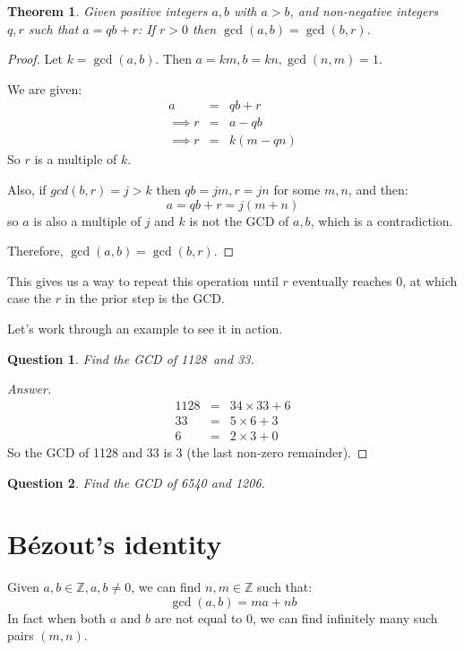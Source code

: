 \documentclass{article}
\newtheorem{theorem}{Theorem}
\newtheorem{question}{Question}
\begin{document}
\begin{theorem}
Given positive integers $a,b$ with $a>b$, and non-negative integers $q,r$ such that $a=qb+r$:
If $r>0$ then $\gcd(a,b) = \gcd(b,r)$.
\end{theorem}

\begin{proof}
Let $k = \gcd(a,b)$. Then $a=km, b=kn, \gcd(n,m) = 1$.

We are given:
\begin{eqnarray*}
	 a &=& qb+r \\
	\implies r &=& a-qb \\
	\implies r &=& k(m-qn) 
\end{eqnarray*}
So $r$ is a multiple of $k$.

Also, if $gcd(b,r)=j > k$ then $qb = jm, r=jn$ for some $m,n$, and then:
\[ a = qb+r = j(m+n) \]
so $a$ is also a multiple of $j$ and $k$ is not the GCD of $a,b$, which is a contradiction.

Therefore, $\gcd(a,b) = \gcd(b,r)$. 
\end{proof}

This gives us a way to repeat this operation until $r$ eventually reaches $0$, at which case the $r$
in the prior step is the GCD.

Let's work through an example to see it in action.

\begin{question}
Find the GCD of 1128\ and 33.
\end{question}
\begin{proof}[Answer]
	\begin{eqnarray*}
		1128 &=& 34\times 33 + 6 \\
		33 &=& 5\times 6 + 3 \\
		6 &=& 2 \times 3 + 0   
	\end{eqnarray*}
	So the GCD of 1128 and 33 is 3 (the last non-zero remainder).
\end{proof}

\begin{question} Find the GCD of 6540 and 1206. \end{question}
\vspace*{\bigskipamount}

\section{Bézout's identity}

Given $a,b \in \mathbb{Z}, a, b \neq 0$, we can find $n,m \in \mathbb{Z}$ such that:
\[ \gcd(a,b) = ma + nb \]
In fact when both $a$ and $b$ are not equal to 0, we can find infinitely many such pairs $(m,n)$.
\end{document}
